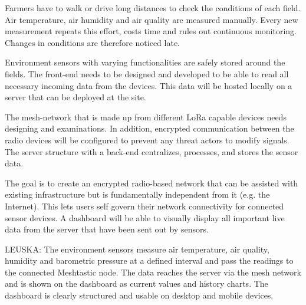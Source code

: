 \abschnittsautor{\alleautoren}


Farmers have to walk or drive long distances to check the conditions of each field. Air temperature, air humidity and air quality are measured manually. Every new measurement repeats this effort, costs time and rules out continuous monitoring. Changes in conditions are therefore noticed late.


Environment sensors with varying functionalities are safely stored around the fields. The front-end needs to be designed and developed to be able to read all necessary incoming data from the devices. This data will be hosted locally on a server that can be deployed at the site.

The mesh-network that is made up from different LoRa capable devices needs designing and examinations. In addition, encrypted communication between the radio devices will be configured to prevent any threat actors to modify signals. The server structure with a back-end centralizes, processes, and stores the sensor data.

The goal is to create an encrypted radio-based network that can be assisted with existing infrastructure but is fundamentally independent from it (e.g. the Internet). This lets users self govern their network connectivity for connected sensor devices. A dashboard will be able to visually display all important live data from the server that have been sent out by sensors.


LEUSKA: The environment sensors measure air temperature, air quality, humidity and barometric pressure at a defined interval and pass the readings to the connected Meshtastic node. The data reaches the server via the mesh network and is shown on the dashboard as current values and history charts. The dashboard is clearly structured and usable on desktop and mobile devices.

